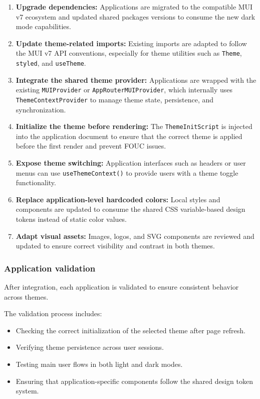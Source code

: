 \begin{enumerate}
    \item \textbf{Upgrade dependencies:} Applications are migrated to the compatible MUI v7 ecosystem and updated shared packages versions to consume the new dark mode capabilities.

    \item \textbf{Update theme-related imports:} Existing imports are adapted to follow the MUI v7 API conventions, especially for theme utilities such as \lstinline|Theme|, \lstinline|styled|, and \lstinline|useTheme|.

    \item \textbf{Integrate the shared theme provider:} Applications are wrapped with the existing \lstinline|MUIProvider| or \lstinline|AppRouterMUIProvider|, which internally uses \lstinline|ThemeContextProvider| to manage theme state, persistence, and synchronization.

    \item \textbf{Initialize the theme before rendering:} The \lstinline|ThemeInitScript| is injected into the application document to ensure that the correct theme is applied before the first render and prevent FOUC issues.

    \item \textbf{Expose theme switching:} Application interfaces such as headers or user menus can use \lstinline|useThemeContext()| to provide users with a theme toggle functionality.

    \item \textbf{Replace application-level hardcoded colors:} Local styles and components are updated to consume the shared CSS variable-based design tokens instead of static color values.

    \item \textbf{Adapt visual assets:} Images, logos, and SVG components are reviewed and updated to ensure correct visibility and contrast in both themes.
\end{enumerate}


\subsubsection{Application validation}

After integration, each application is validated to ensure consistent behavior across themes.

The validation process includes:

\begin{itemize}
    \item Checking the correct initialization of the selected theme after page refresh.
    \item Verifying theme persistence across user sessions.
    \item Testing main user flows in both light and dark modes.
    \item Ensuring that application-specific components follow the shared design token system.
\end{itemize}

